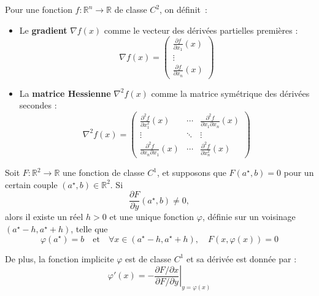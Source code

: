 \begin{f}
	Pour une fonction \( f : \mathbb{R}^n \rightarrow \mathbb{R} \) de classe \( C^2 \), on définit :
	
	\begin{itemize}
		\item Le \textbf{gradient} \( \nabla f(x) \) comme le vecteur des dérivées partielles premières :
		\[
		\nabla f(x) = 
		\begin{pmatrix}
			\frac{\partial f}{\partial x_1}(x) \\
			\vdots \\
			\frac{\partial f}{\partial x_n}(x)
		\end{pmatrix}
		\]
		
		\item La \textbf{matrice Hessienne} \( \nabla^2 f(x) \) comme la matrice symétrique des dérivées secondes :
		\[
		\nabla^2 f(x) =
		\begin{pmatrix}
			\frac{\partial^2 f}{\partial x_1^2}(x) & \cdots & \frac{\partial^2 f}{\partial x_1 \partial x_n}(x) \\
			\vdots & \ddots & \vdots \\
			\frac{\partial^2 f}{\partial x_n \partial x_1}(x) & \cdots & \frac{\partial^2 f}{\partial x_n^2}(x)
		\end{pmatrix}
		\]
	\end{itemize}
\end{f}

\begin{f}
	Soit \( F : \mathbb{R}^2 \rightarrow \mathbb{R} \) une fonction de classe \( C^1 \), et supposons que \( F(a^\star, b) = 0 \) pour un certain couple \( (a^\star, b) \in \mathbb{R}^2 \). Si
	\[
	\frac{\partial F}{\partial y}(a^\star, b) \neq 0,
	\]
	alors il existe un réel \( h > 0 \) et une unique fonction \( \varphi \), définie sur un voisinage \( (a^\star - h, a^\star + h) \), telle que
	\[
	\varphi(a^\star) = b \quad \text{et} \quad \forall x \in (a^\star - h, a^\star + h), \quad F(x, \varphi(x)) = 0
	\]
	
	De plus, la fonction implicite \( \varphi \) est de classe \( C^1 \) et sa dérivée est donnée par :
	\[
	\varphi'(x) = - \left. \frac{\partial F / \partial x}{\partial F / \partial y} \right|_{y = \varphi(x)}
	\]
	

\end{f}
